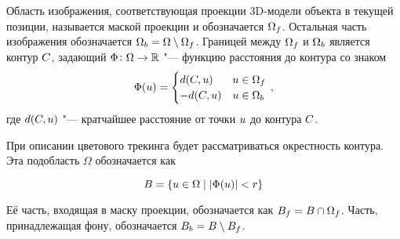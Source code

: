 Область изображения, соответствующая проекции 3D-модели объекта
в текущей позиции, называется маской проекции и обозначается $\Omega_f$.
Остальная часть изображения обозначается
$\Omega_b = \Omega \setminus \Omega_f$.
Границей между $\Omega_f$ и $\Omega_b$ является контур $C$,
задающий
$\Phi \colon \Omega \to \mathbb{R}$ "---
функцию расстояния до контура со знаком
\begin{equation*}
    \Phi(\mathnormal{u}) =
    \begin{cases}
        d(C, \mathnormal{u})  & \mathnormal{u} \in \Omega_f \\
        -d(C, \mathnormal{u})  & \mathnormal{u} \in \Omega_b
    \end{cases}
    \,\text{,}
\end{equation*}
где $d(C, \mathnormal{u})$ "--- кратчайшее расстояние от точки $\mathnormal{u}$
до контура $C$.

При описании цветового трекинга будет рассматриваться окрестность контура.
Эта подобласть $\Omega$ обозначается как 

\begin{equation*}
    B = \{ \mathnormal{u} \in \Omega \mid |\Phi(\mathnormal{u})| < r \}
\end{equation*}

Её часть, входящая в маску проекции, обозначается как
$B_{f} = B \cap \Omega_f$.
Часть, принадлежащая фону, обозначается
$B_{b} = B \setminus B_{f}$.

